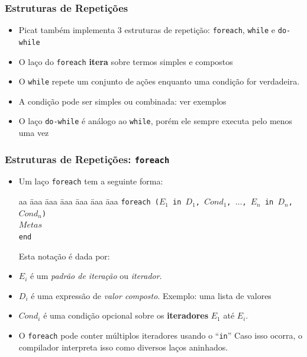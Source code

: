     
    
       
    
\begin{frame}[fragile]
\frametitle{Estruturas de Repetições}
       

\begin{itemize}
    
    \item Picat também implementa 3 estruturas de repetição:
    \texttt{foreach}, \texttt{while} e \texttt{do-while}
    
    \pause
    \item O laço do  \texttt{foreach}  \textbf{itera} sobre termos simples e compostos
    
    \pause
    \item O  \texttt{while} repete um conjunto de ações enquanto uma 
     condição for verdadeira.
     
        \pause
    \item A condição pode ser simples ou combinada: ver exemplos
     
     \pause
    \item O laço \texttt{do-while} é análogo ao  \texttt{while}, porém ele 
    sempre executa pelo menos uma vez
\end{itemize}
\end{frame}    


\begin{frame}[fragile]
\frametitle{Estruturas de Repetições: \texttt{foreach}}

    \begin{itemize}
        \item Um laço \texttt{foreach} tem a seguinte forma:
        
        \begin{tabbing}
            aa \= aaa \= aaa \= aaa \= aaa \= aaa \= aaa \kill
            \> \texttt{foreach ($E_1$ in $D_1$, $Cond_1$, $\ldots$, $E_n$ in $D_n$, $Cond_n$)}  \\
            \> \> $Metas$ \\
            \>  \texttt{end} 
        \end{tabbing}
    
   \pause    
   Esta notação é dada por:        
    \item  $E_i$ é um \emph{padrão de iteração} ou \emph{iterador}. 
        
    \item  $D_i$ é  uma expressão de \emph{valor composto}. Exemplo: uma lista de valores
        
     \item  $Cond_i$ é uma condição opcional sobre os \textbf{iteradores} $E_1$ até $E_i$.
        
     \item O \texttt{foreach} pode conter múltiplos iteradores usando o ``\texttt{in}'' 
     Caso isso ocorra, o compilador interpreta isso como diversos laços aninhados.
        
    \end{itemize}
\end{frame}    


